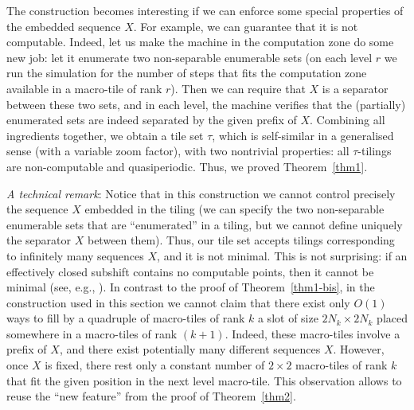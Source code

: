 \documentclass[runningheads]{llncs}
\begin{document}
The construction becomes interesting if we can enforce some special properties of the embedded sequence $X$. For example, we can guarantee that it is not computable. Indeed, let us make the machine in the computation zone do some new job: let it enumerate two non-separable enumerable sets (on each level $r$ we run the simulation for the  number of steps that fits the  computation zone available in a macro-tile of rank $r$). Then we can require that $X$ is a separator between these two sets, and in each level,  the machine verifies that the (partially) enumerated sets are indeed separated by the given prefix of $X$.
Combining all ingredients together, we obtain a tile set $\tau$, which is self-similar in a generalised sense (with a variable zoom factor), with two nontrivial properties: all $\tau$-tilings are non-computable and quasiperiodic. Thus,  we proved Theorem~\ref{thm1}. 

\noindent
\emph{A technical remark}:
Notice that in this construction we cannot control precisely the sequence $X$ embedded in the tiling (we can specify  the two non-separable enumerable sets that are ``enumerated'' in a tiling, but we cannot define uniquely the separator $X$ between them). Thus, our tile set accepts tilings corresponding to infinitely many sequences $X$, and it is not minimal. This is not surprising:  if an effectively closed subshift contains no computable points, then it cannot be minimal (see, e.g., \cite{hochman-2009}).
In contrast to the proof of Theorem~\ref{thm1-bis},
in the construction used in this section we cannot claim that there exist only $O(1)$ ways to fill 
by a quadruple of macro-tiles of rank $k$
a slot of size $2N_k\times2N_k$  placed somewhere in a macro-tiles of rank $(k+1)$. Indeed, these macro-tiles involve a prefix of  $X$, and there exist potentially many different sequences $X$. However, once $X$ is fixed, there rest only a constant number of $2\times2$ macro-tiles of rank $k$ that fit the given position in the next level macro-tile. This observation allows to reuse the ``new feature'' from the proof of Theorem~\ref{thm2}.
\end{document}
